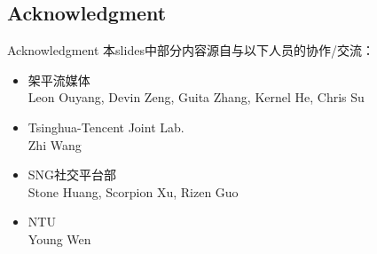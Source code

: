 \documentclass{beamer}
\begin{document}
\subsection{Acknowledgment}
\begin{frame}{Acknowledgment}
本slides中部分内容源自与以下人员的协作/交流：
\begin{itemize}
\item 架平流媒体\\
Leon Ouyang, Devin Zeng, Guita Zhang, Kernel He, Chris Su
\item Tsinghua-Tencent Joint Lab.\\ 
Zhi Wang
\item SNG社交平台部\\
Stone Huang, Scorpion Xu, Rizen Guo
\item NTU\\
Young Wen
\end{itemize}
\end{frame}
\end{document}
